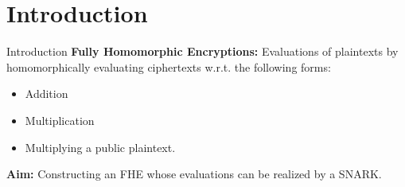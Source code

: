 \section{Introduction}
\begin{frame}{Introduction}
	\textbf{Fully Homomorphic Encryptions:} Evaluations of plaintexts by homomorphically evaluating ciphertexts w.r.t. the following forms:
	\begin{itemize}
		\item Addition
		\item Multiplication
		\item Multiplying a public plaintext.
	\end{itemize}
	
	\textbf{Aim:} 
	Constructing an FHE whose evaluations can be realized by a SNARK.
\end{frame}